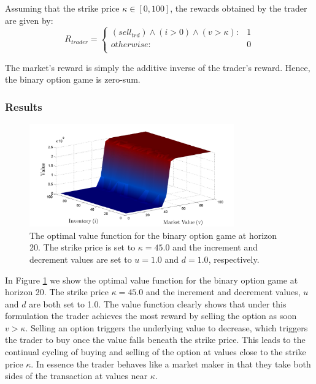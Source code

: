 
Assuming that the strike price $\kappa \in [0, 100]$, the rewards obtained by the trader are given by:
{\small 
\begin{equation}
  R_{trader} = 
    \begin{cases}
      (sell_{trd}) \wedge (i > 0) \wedge (v > \kappa) : & 1 \\ 
      otherwise : & 0 \\
    \end{cases} \nonumber
\end{equation}
}%

The market's reward is simply the additive inverse of the trader's 
reward. Hence, the binary option game is zero-sum. 

\subsubsection{Results}


\begin{figure}[h!]
\includegraphics[width=250pt]{sbo.pdf}
\vspace{-3mm}
\caption{The optimal value function for the binary option game at horizon 20. The strike price is set to $\kappa = 45.0$ and the increment and
decrement values are set to $u = 1.0$ and $d = 1.0$, respectively.}
\label{fig:binaryoptionvfunc}
\end{figure}

In Figure \ref{fig:binaryoptionvfunc} we show the optimal value function for the
binary option game at horizon 20. The strike price $\kappa = 45.0$ and
the increment and decrement values, $u$ and $d$ are both set to 1.0. The
value function clearly shows that under this formulation the trader
achieves the most reward by selling the option as soon $v > \kappa$.
Selling an option triggers the underlying value to decrease, which triggers
the trader to buy once the value falls beneath the strike price. This leads
to the continual cycling of buying and selling of the option at values close
to the strike price $\kappa$. In essence the trader behaves like a market
maker in that they take both sides of the transaction at values near 
$\kappa$.

